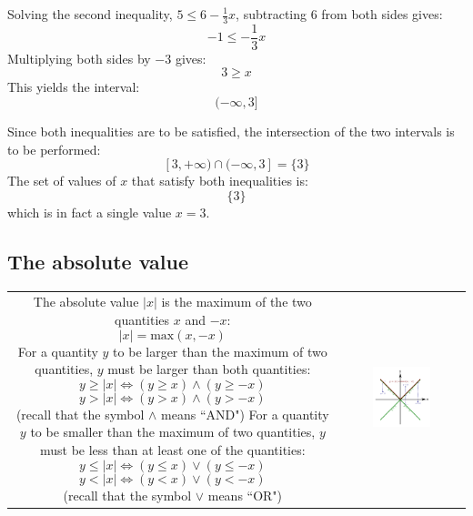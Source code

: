 \documentclass{article}
\begin{document}
Solving the second inequality, \(5 \leq 6 - \frac{1}{3}x\), subtracting \(6\) from both sides gives: 
\[-1 \leq -\frac{1}{3}x\]
Multiplying both sides by \(-3\) gives: 
\[3 \geq x\]  
This yields the interval:
\[(-\infty, 3]\]

Since both inequalities are to be satisfied, the intersection of the two intervals is to be performed:
\[[3, +\infty) \cap (-\infty, 3] = \{3\}\]
The set of values of \(x\) that satisfy both inequalities is:
\[\{3\}\]
which is in fact a single value \(x = 3\). 

\vspace{5mm}



\subsection*{The absolute value}

\begin{tabular}{cc}
\parbox{0.5\textwidth}{
The absolute value \(|x|\) is the maximum of the two quantities \(x\) and \(-x\): 
\[|x| = \text{max}(x, -x)\]
For a quantity \(y\) to be larger than the maximum of two quantities, \(y\) must be larger than both quantities: 
\[y \geq |x| \iff (y \geq x) \wedge (y \geq -x)\]
\[y > |x| \iff (y > x) \wedge (y > -x)\]
(recall that the symbol \(\wedge\) means ``AND") \\
For a quantity \(y\) to be smaller than the maximum of two quantities, \(y\) must be less than at least one of the quantities: 
\[y \leq |x| \iff (y \leq x) \vee (y \leq -x)\]
\[y < |x| \iff (y < x) \vee (y < -x)\]
(recall that the symbol \(\vee\) means ``OR")
} & \parbox{0.5\textwidth}{
\includegraphics[width = 0.5\textwidth]{absolute_value_as_a_maximum}
}
\end{tabular}
\end{document}

